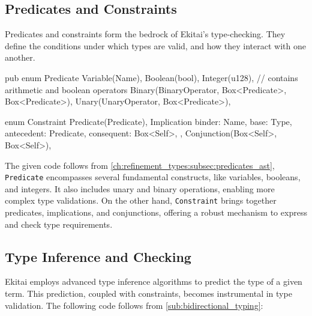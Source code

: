 \documentclass[
  oneside,
  english,
  coorientadorbanca,
  noabntexcite
]{ufsc-thesis-rn46-2019}
\begin{document}
\subsection{Predicates and Constraints}

Predicates and constraints form the bedrock of Ekitai's type-checking. They define the conditions under which types are valid, and how they interact with one another.

\begin{rustcode}
  pub enum Predicate {
    Variable(Name),
    Boolean(bool),
    Integer(u128),
    // contains arithmetic and boolean operators
    Binary(BinaryOperator, Box<Predicate>, Box<Predicate>),
    Unary(UnaryOperator, Box<Predicate>),
  }
  
  enum Constraint {
    Predicate(Predicate),
    Implication {
        binder: Name,
        base: Type,
        antecedent: Predicate,
        consequent: Box<Self>,
    },
    Conjunction(Box<Self>, Box<Self>),
  }
\end{rustcode}
  
The given code follows from \autoref{ch:refinement_types:subsec:predicates_ast}, \texttt{Predicate} encompasses several fundamental constructs, like variables, booleans, and integers. It also includes unary and binary operations, enabling more complex type validations. On the other hand, \texttt{Constraint} brings together predicates, implications, and conjunctions, offering a robust mechanism to express and check type requirements.

\subsection{Type Inference and Checking}

Ekitai employs advanced type inference algorithms to predict the type of a given term. This prediction, coupled with constraints, becomes instrumental in type validation. The following code follows from \autoref{sub:bidirectional_typing}:
\end{document}
